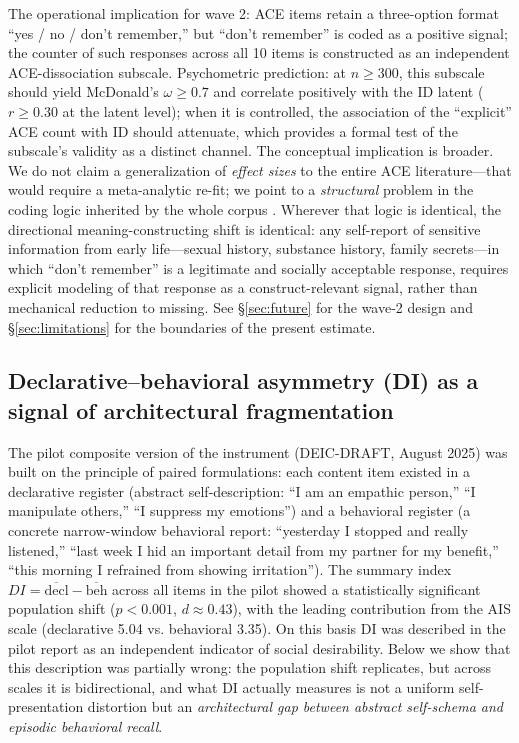 The operational implication for wave 2: ACE items retain a three-option format ``yes / no / don't remember,'' but ``don't remember'' is coded as a positive signal; the counter of such responses across all 10 items is constructed as an independent ACE-dissociation subscale. Psychometric prediction: at $n \ge 300$, this subscale should yield McDonald's $\omega \ge 0.7$ and correlate positively with the ID latent ($r \ge 0.30$ at the latent level); when it is controlled, the association of the ``explicit'' ACE count with ID should attenuate, which provides a formal test of the subscale's validity as a distinct channel. The conceptual implication is broader. We do not claim a generalization of \emph{effect sizes} to the entire ACE literature---that would require a meta-analytic re-fit; we point to a \emph{structural} problem in the coding logic inherited by the whole corpus \citep{felitti1998}. Wherever that logic is identical, the directional meaning-constructing shift is identical: any self-report of sensitive information from early life---sexual history, substance history, family secrets---in which ``don't remember'' is a legitimate and socially acceptable response, requires explicit modeling of that response as a construct-relevant signal, rather than mechanical reduction to missing. See §\ref{sec:future} for the wave-2 design and §\ref{sec:limitations} for the boundaries of the present estimate.

\subsection{Declarative--behavioral asymmetry (DI) as a signal of architectural fragmentation}
\label{subsec:di_asymmetry}

The pilot composite version of the instrument (DEIC-DRAFT, August 2025) was built on the principle of paired formulations: each content item existed in a declarative register (abstract self-description: ``I am an empathic person,'' ``I manipulate others,'' ``I suppress my emotions'') and a behavioral register (a concrete narrow-window behavioral report: ``yesterday I stopped and really listened,'' ``last week I hid an important detail from my partner for my benefit,'' ``this morning I refrained from showing irritation''). The summary index $DI = \overline{\text{decl}} - \overline{\text{beh}}$ across all items in the pilot showed a statistically significant population shift ($p < 0.001$, $d \approx 0.43$), with the leading contribution from the AIS scale (declarative 5.04 vs. behavioral 3.35). On this basis DI was described in the pilot report as an independent indicator of social desirability. Below we show that this description was partially wrong: the population shift replicates, but across scales it is bidirectional, and what DI actually measures is not a uniform self-presentation distortion but an \emph{architectural gap between abstract self-schema and episodic behavioral recall}.

